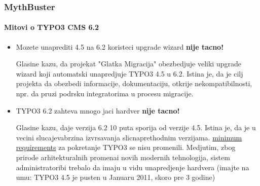 \begin{frame}[fragile]
	\frametitle{MythBuster}
	\framesubtitle{Mitovi o TYPO3 CMS 6.2}

	\begin{itemize}
		\item Mozete unaprediti  4.5 na 6.2 koristeci upgrade wizard
			\tabto{8cm}\color{red}\textbf{\textrightarrow nije tacno!}\color{black}

			\smaller
				Glasine kazu, da projekat "Glatka Migracija" obezbedjuje veliki upgrade wizard koji automatski unapredjuje TYPO3 4.5 u 6.2. Istina je, da je cilj projekta da obezbedi informacije,  dokumentaciju, otkrije nekompatibilnosti, npr. da pruzi podrsku integratorima u procesu migracije.
			\normalsize

		\item TYPO3 6.2 zahteva mnogo jaci hardver
			\tabto{8cm}\color{red}\textbf{\textrightarrow nije tacno!}\color{black}

			\smaller
				Glasine kazu, daje verzija 6.2 10 puta sporija od verzije 4.5. Istina je, da je u vecini slucajevabrzina izvrsavanja slicnaprethodnim verzijama. \href{http://typo3.org/about/typo3-the-cms/system-requirements/}{minimum requirements} za pokretanje TYPO3 se nisu promenili. Medjutim, zbog prirode arhitekturalnih promenai novih modernih tehnologija, sistem administratoribi trebalo da imaju u vidu unapredjenje hardvera (imajte na umu: TYPO3 4.5 je pusten u Januaru 2011, skoro pre 3 godine)
			\normalsize

	\end{itemize}

\end{frame}


